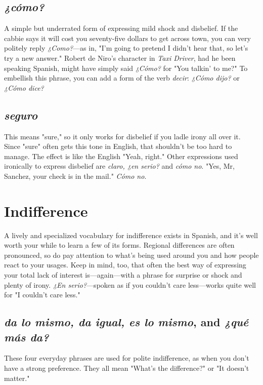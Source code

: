 \subsection{\emph{¿cómo?}}

A simple but underrated form of expressing mild shock and
disbelief. If the cabbie says it will cost you seventy-five dollars to get
across town, you can very politely reply \emph{¿Como?}---as in, "I'm going to
pretend I didn't hear that, so let's try a new answer." Robert de Niro's
character in \emph{Taxi Driver}, had he been speaking Spanish, might have
simply said \emph{¿Cómo?} for "You talkin' to me?" To embellish this phrase,
you can add a form of the verb \emph{decir}: \emph{¿Cómo dijo?} or \emph{¿Cómo dice?}

\subsection{\emph{seguro}}

This means "sure," so it only works for disbelief if you ladle
irony all over it. Since "sure" often gets this tone in English, that
shouldn't be too hard to manage. The effect is like the English "Yeah,
right." Other expressions used ironically to express disbelief are \emph{claro,
¿en serio?} and \emph{cómo no}. "Yes, Mr, Sanchez, your check is in the mail."
\emph{Cómo no}.

\section{Indifference}

A lively and specialized vocabulary for indifference exists in
Spanish, and it's well worth your while to learn a few of its forms. Regional differences are often pronounced, so do pay attention to what's
being used around you and how people react to your usages. Keep in
mind, too, that often the best way of expressing your total lack of interest is---again---with a phrase for surprise or shock and plenty of
irony. \emph{¿En serio?}---spoken as if you couldn't care less---works quite
well for "I couldn't care less."

\subsection{\emph{da lo mismo, da igual, es lo mismo}, and \emph{¿qué más da?}}

These four everyday phrases are used for polite indifference, as
when you don't have a strong preference. They all mean "What's the
difference?" or "It doesn't matter."

